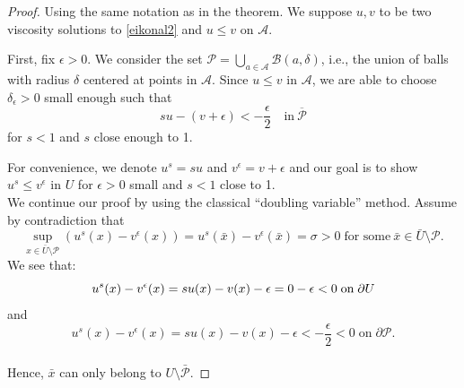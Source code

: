 \documentclass[12pt,reqno]{amsart}
\numberwithin{figure}{section}
\theoremstyle{plain}
\numberwithin{equation}{section}
\newcommand{\cB}{\mathcal{B}}
\begin{document}
\begin{proof}
    Using the same notation as in the theorem. We suppose $u,v$ to be two viscosity solutions to \eqref{eikonal2} and $u\le v$ on $\mathcal{A}$.
    
    First, fix $\epsilon>0$. We consider the set $\mathcal{P}=\bigcup_{a\in\mathcal{A}}\cB(a,\delta)$, i.e., the union of balls with radius \( \delta \) centered at points in \( \mathcal{A} \). Since $u\le v$ in $\mathcal{A}$, we are able to choose $\delta_{\epsilon}>0$ small enough such that 
    \[
    su-(v+\epsilon)< -\frac{\epsilon}{2} \quad \text{in} \ \overline{\mathcal{P}}
    \]
for $s<1$ and $s$ close enough to 1.

For convenience, we denote $u^s = su$ and $v^{\epsilon}= v+\epsilon$ and our goal is to show $u^s \le v^{\epsilon}$ in $U$ for $\epsilon >0$ small and $s<1$ close to 1.\\
We continue our proof by using the classical ``doubling variable'' method. Assume by contradiction that 
\[
    \sup_{x\in \bar{U}\setminus\mathcal{P}}(u^s (x)-v^{\epsilon}(x)) = u^s (\bar x)-v^{\epsilon}(\bar x)= \sigma >0 \; \text{for some} \ \bar x\in \bar U\setminus \mathcal{P}.
\]
We see that:
\[
    u^{s}(x)-v^{\epsilon}(x) = su(x)-v(x)-\epsilon = 0-\epsilon<0 \; \text{on}\;\partial U \\
\]
and
\[
    u^s (x)-v^{\epsilon}(x) = su(x)-v(x)-\epsilon<-\frac{\epsilon}{2}<0 \;\text{on}\; \partial \mathcal{P}. 
\]\\
Hence, $\bar x $ can only belong to $U\setminus \mathcal{\bar P}$.


\end{proof}
\end{document}
